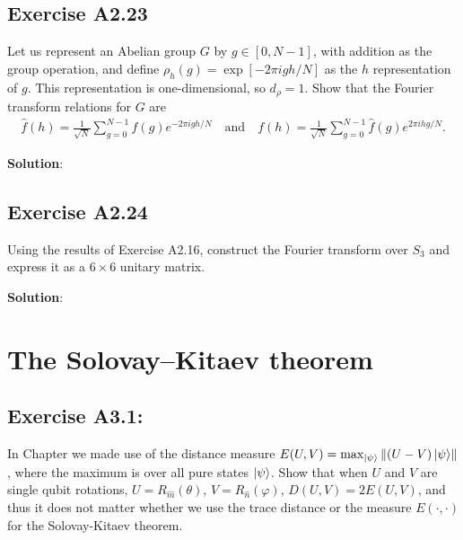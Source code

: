 \documentclass{book}
\begin{document}
\section*{Exercise A2.23}
    Let us represent an Abelian group $G$ by $g\in [0,N-1]$, with addition as the group operation, and define $\rho_h(g) = \exp[-2\pi i gh/N]$ as the $h$ representation of $g$. This representation is one-dimensional, so $d_\rho = 1$. Show that the Fourier transform relations for $G$ are 
    \begin{align}
        \hat{f}(h)= \frac{1}{\sqrt{N}} \sum_{g=0}^{N-1} f(g) e^{-2\pi i g h/N} \quad \text{and} \quad f(h)= \frac{1}{\sqrt{N}} \sum_{g=0}^{N-1} \hat{f}(g) e^{2\pi i h g/N}.
    \end{align}
    
    \textbf{Solution}:
    
\section*{Exercise A2.24}
    Using the results of Exercise A2.16, construct the Fourier transform over $S_3$ and express it as a $6\times6$ unitary matrix.
    
    \textbf{Solution}:


\chapter{The Solovay–Kitaev theorem}

\section*{Exercise A3.1:} 
    In Chapter we made use of the distance measure $E(U,V)=\max_{\ket{\psi}}\norm{(U-V)\ket{\psi}}$, where the maximum is over all pure states $\ket{\psi}$. Show that when $U$ and $V$ are single qubit rotations, $U = R_{\hat{m}}(\theta)$, $V = R_{\hat{n}}(\varphi)$, $D(U,V) = 2 E(U,V)$, and thus it does not matter whether we use the trace distance or the measure $E(\cdot, \cdot)$ for the Solovay-Kitaev theorem.
    
\end{document}
